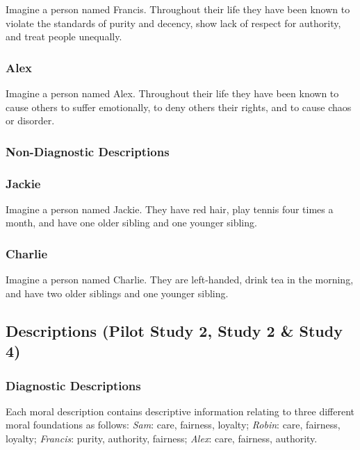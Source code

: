 \documentclass[
  american,
  man,mask,floatsintext]{apa6}
\begin{document}
Imagine a person named Francis.
Throughout their life they have been known to violate the standards of purity and decency, show lack of respect for authority, and treat people unequally.

\hypertarget{alex}{%
\subsubsection{Alex}\label{alex}}

Imagine a person named Alex.
Throughout their life they have been known to cause others to suffer emotionally, to deny others their rights, and to cause chaos or disorder.

\hypertarget{non-diagnostic-descriptions}{%
\subsubsection{Non-Diagnostic Descriptions}\label{non-diagnostic-descriptions}}

\hypertarget{jackie}{%
\subsubsection{Jackie}\label{jackie}}

Imagine a person named Jackie.
They have red hair, play tennis four times a month, and have one older sibling and one younger sibling.

\hypertarget{charlie}{%
\subsubsection{Charlie}\label{charlie}}

Imagine a person named Charlie.
They are left-handed, drink tea in the morning, and have two older siblings and one younger sibling.

\hypertarget{descriptions-pilot-study-2-study-2-study-4}{%
\subsection{Descriptions (Pilot Study 2, Study 2 \& Study 4)}\label{descriptions-pilot-study-2-study-2-study-4}}

\hypertarget{diagnostic-descriptions-1}{%
\subsubsection{Diagnostic Descriptions}\label{diagnostic-descriptions-1}}

Each moral description contains descriptive information relating to three different moral foundations as follows: \emph{Sam}: care, fairness, loyalty; \emph{Robin}: care, fairness, loyalty; \emph{Francis}: purity, authority, fairness; \emph{Alex}: care, fairness, authority.
\end{document}
